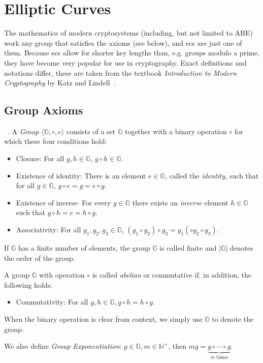 \section{Elliptic Curves}
\label{sec:ec}

The mathematics of modern cryptosystems (including, but not limited to ABE) work any group that satisfies the axioms (see below), and \glspl{ec} are just one of them.
Because \Glspl{ec} allow for shorter key lengths than, e.g. groups modulo a prime, they have become very popular for use in cryptography.
Exact definitions and notations differ, these are taken from the textbook \emph{Introduction to Modern Cryptography} by Katz and Lindell~\cite{katz_introduction_2015}.

\subsection{Group Axioms}\label{sec:group}
\begin{definition}~\cite{katz_introduction_2015}. A \emph{Group} $\langle \mathbb{G}, \circ, e \rangle$ consists of a set $\mathbb{G}$ together with a binary operation $\circ$ for which these four conditions hold:
    \begin{itemize}
        \item Closure: For all $g, h \in \mathbb{G}$, $g \circ h \in \mathbb{G}$.
        \item Existence of identity: There is an element $e \in \mathbb{G}$, called the \emph{identity}, such that for all $g \in \mathbb{G}$, $g \circ e = g = e \circ g$.
        \item Existence of inverse: For every $g \in \mathbb{G}$ there exists an \emph{inverse} element $h \in \mathbb{G}$ such that $g \circ h = e = h \circ g$.
        \item Associativity: For all $g_1, g_2, g_3 \in \mathbb{G}$, $(g_1 \circ g_2) \circ g_3 = g_1 (\circ g_2 \circ g_3)$.
    \end{itemize}
    If $\mathbb{G}$ has a finite number of elements, the group $\mathbb{G}$ is called finite and $|\mathbb{G}|$ denotes the order of the group.

    A group $\mathbb{G}$ with operation $\circ$ is called \emph{abelian} or commutative if, in addition, the following holds:
    \begin{itemize}
        \item Commutativity: For all $g, h \in \mathbb{G}, g \circ h = h \circ g$.
    \end{itemize}

    When the binary operation is clear from context, we simply use $\mathbb{G}$ to denote the group.

    We also define \emph{Group Exponentiation}: $g \in \mathbb{G}, m \in \mathbb{N}^+$, then $mg = \underbrace{g \circ \cdots \circ g}_{m \text{ times}}$.
\end{definition}


